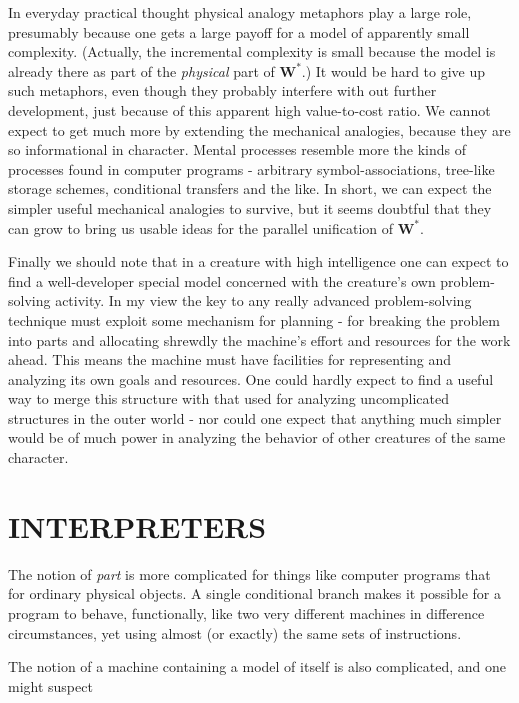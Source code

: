 \documentclass{article}
\begin{document}
In everyday practical thought physical analogy metaphors play a large role, presumably because one gets a large payoff for a model of apparently small complexity. (Actually, the incremental complexity is small because the model is already there as part of the \textit{physical} part of $\mathbf{W^{\ast}}$.) It would be hard to give up such metaphors, even though they probably interfere with out further development, just because of this apparent high value-to-cost ratio. We cannot expect to get much more by extending the mechanical analogies, because they are so informational in character. Mental processes resemble more the kinds of processes found in computer programs - arbitrary symbol-associations, tree-like storage schemes, conditional transfers and the like. In short, we can expect the simpler useful mechanical analogies to survive, but it seems doubtful that they can grow to bring us usable ideas for the parallel unification of $\mathbf{W^{\ast}}$.

Finally we should note that in a creature with high intelligence one can expect to find a well-developer special model concerned with the creature's own problem-solving activity. In my view the key to any really advanced problem-solving technique must exploit some mechanism for planning - for breaking the problem into parts and allocating shrewdly the machine's effort and resources for the work ahead. This means the machine must have facilities for representing and analyzing its own goals and resources. One could hardly expect to find a useful way to merge this structure with that used for analyzing uncomplicated structures in the outer world - nor could one expect that anything much simpler would be of much power in analyzing the behavior of other creatures of the same character.

\section*{INTERPRETERS}

The notion of \textit{part} is more complicated for things like computer programs that for ordinary physical objects. A single conditional branch makes it possible for a program to behave, functionally, like two very different machines in difference circumstances, yet using almost (or exactly) the same sets of instructions.

The notion of a machine containing a model of itself is also complicated, and one might suspect

\newpage
\end{document}
